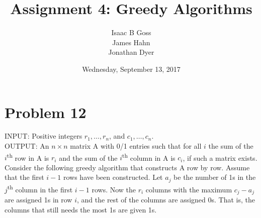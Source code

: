\documentclass{article}
\author{Isaac B Goss\\ James Hahn\\ Jonathan Dyer}
\title{Assignment 4: Greedy Algorithms}
\date{Wednesday, September 13, 2017}
\providecommand{\prob}[1]{\section*{Problem #1}}
\begin{document}
\maketitle

    \prob{12}
	INPUT: Positive integers $r_1, \dots, r_n $, and $c_1, \dots, c_n$. \\
	OUTPUT: An $n \times n$ matrix A with 0/1 entries such that for all $i$ the sum of the $i$\textsuperscript{th} row in A is $r_i$ and the sum of
	the $i$\textsuperscript{th} column in A is $c_i$, if such a matrix exists. Consider the following greedy algorithm that constructs A row
	by row. Assume that the first $i - 1$ rows have been constructed. Let $a_j$ be the number of 1\textsc{}s in the $j$\textsuperscript{th} column in
	the first $i - 1$ rows. Now the $r_i$ columns with the maximum $c_j - a_j$ are assigned 1\textsc{}s in row $i$, and the rest of the columns
	are assigned 0\textsc{}s. That is, the columns that still needs the most 1\textsc{}s are given 1\textsc{}s.
	
\end{document}
